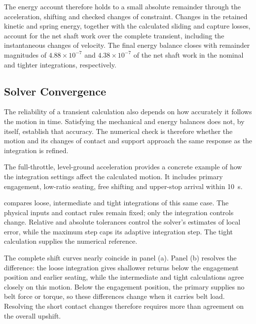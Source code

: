 \documentclass[11pt]{report}
\numberwithin{equation}{section}
\begin{document}
The energy account therefore holds to a small absolute remainder through
the acceleration, shifting and checked changes of constraint. Changes in the
retained kinetic and spring energy, together with the calculated sliding and
capture losses, account for the net shaft work over the complete transient,
including the instantaneous changes of velocity. The final energy balance
closes with remainder magnitudes of \(4.88\times10^{-7}\) and
\(4.38\times10^{-7}\) of the net shaft work in the nominal and tighter
integrations, respectively.
\FloatBarrier


\subsection{Solver Convergence}
\label{sec:results_solver_convergence}

The reliability of a transient calculation also depends on how accurately it
follows the motion in time. Satisfying the mechanical and energy balances
does not, by itself, establish that accuracy. The numerical check is
therefore whether the motion and its changes of contact and support approach
the same response as the integration is refined.

The full-throttle, level-ground acceleration provides a concrete example
of how the integration settings affect the calculated motion. It includes
primary engagement, low-ratio seating, free shifting and upper-stop arrival
within \SI{10}{s}.

 compares loose, intermediate
and tight integrations of this same case. The physical inputs and contact
rules remain fixed; only the integration controls change. Relative and
absolute tolerances control the solver's estimates of local error, while
the maximum step caps its adaptive integration step. The tight calculation
supplies the numerical reference.

The complete shift curves nearly coincide in panel (a). Panel (b) resolves
the difference: the loose integration gives shallower returns below the
engagement position and earlier seating, while the intermediate and tight
calculations agree closely on this motion. Below the engagement position,
the primary supplies no belt force or torque, so these differences change
when it carries belt load. Resolving the short contact changes therefore
requires more than agreement on the overall upshift.
\end{document}
